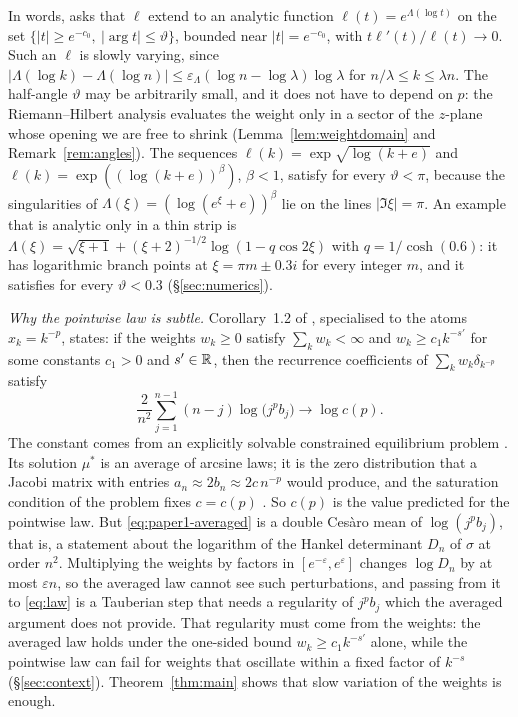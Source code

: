 In words, \Ath{\vartheta} asks that $\ell$ extend to an analytic function $\ell(t)=e^{\Lambda(\log t)}$
on the set $\{|t|\ge e^{-c_0},\ |\arg t|\le\vartheta\}$, bounded near $|t|=e^{-c_0}$, with $t\ell'(t)/\ell(t)\to0$. Such an
$\ell$ is slowly varying, since $|\Lambda(\log k)-\Lambda(\log n)|\le\varepsilon_\Lambda(\log
n-\log\lambda)\log\lambda$ for $n/\lambda\le k\le\lambda n$. The half-angle $\vartheta$ may be arbitrarily small, and
it does not have to depend on $p$: the Riemann--Hilbert analysis evaluates the weight only in a sector of the $z$-plane
whose opening we are free to shrink (Lemma~\ref{lem:weightdomain} and Remark~\ref{rem:angles}). The sequences
$\ell(k)=\exp\sqrt{\log(k+e)}$ and $\ell(k)=\exp((\log(k+e))^\beta)$, $\beta<1$, satisfy \Ath{\vartheta} for every
$\vartheta<\pi$, because the singularities of $\Lambda(\xi)=(\log(e^\xi+e))^\beta$ lie on the lines $|\Im\xi|=\pi$. An
example that is analytic only in a thin strip is $\Lambda(\xi)=\sqrt{\xi+1}+(\xi+2)^{-1/2}\log(1-q\cos2\xi)$ with
$q=1/\cosh(0.6)$: it has logarithmic branch points at $\xi=\pi m\pm0.3i$ for every integer $m$, and it satisfies
\Ath{\vartheta} for every $\vartheta<0.3$ (\S\ref{sec:numerics}).

\emph{Why the pointwise law is subtle.} Corollary~1.2 of \cite{Paper1}, specialised to the atoms $x_k=k^{-p}$,
states: if the weights $w_k\ge0$ satisfy $\sum_kw_k<\infty$ and $w_k\ge c_1k^{-s'}$ for some constants $c_1>0$ and
$s'\in\mathbb{R}$, then the recurrence coefficients of $\sum_kw_k\delta_{k^{-p}}$ satisfy
\begin{equation}\label{eq:paper1-averaged}
  \frac{2}{n^2}\sum_{j=1}^{n-1}(n-j)\log\bigl(j^pb_j\bigr)\longrightarrow\log c(p).
\end{equation}
The constant comes from an explicitly solvable constrained equilibrium problem \cite[Theorem~1.3]{Paper1}. Its
solution $\mu^*$ is an average of arcsine laws; it is the zero distribution that a Jacobi matrix with entries
$a_n\approx2b_n\approx2c\,n^{-p}$ would produce, and the saturation condition of the problem fixes $c=c(p)$
\cite[\S1.2]{Paper1}. So $c(p)$ is the value predicted for the pointwise law. But \eqref{eq:paper1-averaged} is a
double Ces\`aro mean of $\log(j^pb_j)$, that is, a statement about the logarithm of the Hankel determinant $D_n$ of
$\sigma$ at order $n^2$. Multiplying the weights by factors in $[e^{-\varepsilon},e^{\varepsilon}]$ changes $\log D_n$ by
at most $\varepsilon n$, so the averaged law cannot see such perturbations, and passing from it to \eqref{eq:law} is a
Tauberian step that needs a regularity of $j^pb_j$ which the averaged argument does not provide. That regularity must come from the weights: the
averaged law holds under the one-sided bound $w_k\ge c_1k^{-s'}$ alone, while the pointwise law can fail for weights
that oscillate within a fixed factor of $k^{-s}$ (\S\ref{sec:context}). Theorem~\ref{thm:main} shows that slow
variation of the weights is enough.

